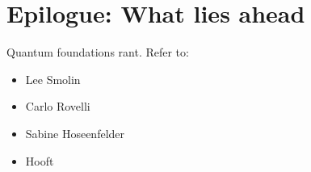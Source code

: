 \chapter{Epilogue: What lies ahead}
Quantum foundations rant. Refer to:
\begin{itemize}
\item Lee Smolin
\item Carlo Rovelli
\item Sabine Hoseenfelder
\item Hooft
\end{itemize}